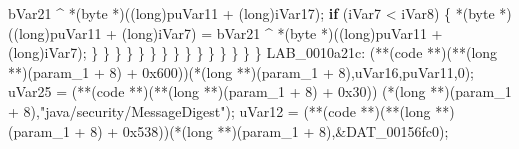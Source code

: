 \documentclass[
]{article}
\newenvironment{Shaded}{}{}
\newcommand{\BaseNTok}[1]{\textcolor[rgb]{0.25,0.63,0.44}{#1}}
\newcommand{\ControlFlowTok}[1]{\textcolor[rgb]{0.00,0.44,0.13}{\textbf{#1}}}
\newcommand{\DataTypeTok}[1]{\textcolor[rgb]{0.56,0.13,0.00}{#1}}
\newcommand{\DecValTok}[1]{\textcolor[rgb]{0.25,0.63,0.44}{#1}}
\newcommand{\NormalTok}[1]{#1}
\newcommand{\OperatorTok}[1]{\textcolor[rgb]{0.40,0.40,0.40}{#1}}
\newcommand{\StringTok}[1]{\textcolor[rgb]{0.25,0.44,0.63}{#1}}
\begin{document}
\begin{Shaded}
\begin{Highlighting}[]
\NormalTok{                                   bVar21 }\OperatorTok{\^{}} \OperatorTok{*(}\NormalTok{byte }\OperatorTok{*)((}\DataTypeTok{long}\OperatorTok{)}\NormalTok{puVar11 }\OperatorTok{+} \OperatorTok{(}\DataTypeTok{long}\OperatorTok{)}\NormalTok{iVar17}\OperatorTok{);}
                              \ControlFlowTok{if} \OperatorTok{(}\NormalTok{iVar7 }\OperatorTok{\textless{}}\NormalTok{ iVar8}\OperatorTok{)} \OperatorTok{\{}
                                \OperatorTok{*(}\NormalTok{byte }\OperatorTok{*)((}\DataTypeTok{long}\OperatorTok{)}\NormalTok{puVar11 }\OperatorTok{+} \OperatorTok{(}\DataTypeTok{long}\OperatorTok{)}\NormalTok{iVar7}\OperatorTok{)} \OperatorTok{=}
\NormalTok{                                     bVar21 }\OperatorTok{\^{}} \OperatorTok{*(}\NormalTok{byte }\OperatorTok{*)((}\DataTypeTok{long}\OperatorTok{)}\NormalTok{puVar11 }\OperatorTok{+} \OperatorTok{(}\DataTypeTok{long}\OperatorTok{)}\NormalTok{iVar7}\OperatorTok{);}
                              \OperatorTok{\}}
                            \OperatorTok{\}}
                          \OperatorTok{\}}
                        \OperatorTok{\}}
                      \OperatorTok{\}}
                    \OperatorTok{\}}
                  \OperatorTok{\}}
                \OperatorTok{\}}
              \OperatorTok{\}}
            \OperatorTok{\}}
          \OperatorTok{\}}
        \OperatorTok{\}}
      \OperatorTok{\}}
    \OperatorTok{\}}
  \OperatorTok{\}}
\NormalTok{LAB\_0010a21c}\OperatorTok{:}
  \OperatorTok{(**(}\NormalTok{code }\OperatorTok{**)(**(}\DataTypeTok{long} \OperatorTok{**)(}\NormalTok{param\_1 }\OperatorTok{+} \DecValTok{8}\OperatorTok{)} \OperatorTok{+} \BaseNTok{0x600}\OperatorTok{))(*(}\DataTypeTok{long} \OperatorTok{**)(}\NormalTok{param\_1 }\OperatorTok{+} \DecValTok{8}\OperatorTok{),}\NormalTok{uVar16}\OperatorTok{,}\NormalTok{puVar11}\OperatorTok{,}\DecValTok{0}\OperatorTok{);}
\NormalTok{  uVar25 }\OperatorTok{=} \OperatorTok{(**(}\NormalTok{code }\OperatorTok{**)(**(}\DataTypeTok{long} \OperatorTok{**)(}\NormalTok{param\_1 }\OperatorTok{+} \DecValTok{8}\OperatorTok{)} \OperatorTok{+} \BaseNTok{0x30}\OperatorTok{))}
                     \OperatorTok{(*(}\DataTypeTok{long} \OperatorTok{**)(}\NormalTok{param\_1 }\OperatorTok{+} \DecValTok{8}\OperatorTok{),}\StringTok{"java/security/MessageDigest"}\OperatorTok{);}
\NormalTok{  uVar12 }\OperatorTok{=} \OperatorTok{(**(}\NormalTok{code }\OperatorTok{**)(**(}\DataTypeTok{long} \OperatorTok{**)(}\NormalTok{param\_1 }\OperatorTok{+} \DecValTok{8}\OperatorTok{)} \OperatorTok{+} \BaseNTok{0x538}\OperatorTok{))(*(}\DataTypeTok{long} \OperatorTok{**)(}\NormalTok{param\_1 }\OperatorTok{+} \DecValTok{8}\OperatorTok{),\&}\NormalTok{DAT\_00156fc0}\OperatorTok{);}

\end{Highlighting}
\end{Shaded}
\end{document}
